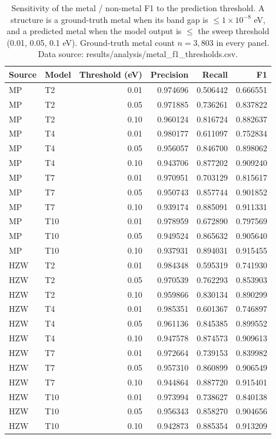 \documentclass[a4paper,10pt]{article}
\begin{document}
\begin{table}[htbp]
\centering
\caption{Sensitivity of the metal / non-metal F1 to the prediction threshold. A structure is a ground-truth metal when its band gap is \(\le 1\times10^{-8}\) eV, and a predicted metal when the model output is \(\le\) the sweep threshold (0.01, 0.05, 0.1 eV). Ground-truth metal count \(n=3{,}803\) in every panel. Data source: \textnormal{results/analysis/metal\_f1\_thresholds.csv}.}
\label{tab:f1-thresholds}
\scriptsize
\begin{tabular}{l l r r r r}
\toprule
Source & Model & Threshold (eV) & Precision & Recall & F1 \\
\midrule
MP & T2  & 0.01 & 0.974696 & 0.506442 & 0.666551 \\
MP & T2  & 0.05 & 0.971885 & 0.736261 & 0.837822 \\
MP & T2  & 0.10 & 0.960124 & 0.816724 & 0.882637 \\
MP & T4  & 0.01 & 0.980177 & 0.611097 & 0.752834 \\
MP & T4  & 0.05 & 0.956057 & 0.846700 & 0.898062 \\
MP & T4  & 0.10 & 0.943706 & 0.877202 & 0.909240 \\
MP & T7  & 0.01 & 0.970951 & 0.703129 & 0.815617 \\
MP & T7  & 0.05 & 0.950743 & 0.857744 & 0.901852 \\
MP & T7  & 0.10 & 0.939174 & 0.885091 & 0.911331 \\
MP & T10 & 0.01 & 0.978959 & 0.672890 & 0.797569 \\
MP & T10 & 0.05 & 0.949524 & 0.865632 & 0.905640 \\
MP & T10 & 0.10 & 0.937931 & 0.894031 & 0.915455 \\
\midrule
HZW & T2  & 0.01 & 0.984348 & 0.595319 & 0.741930 \\
HZW & T2  & 0.05 & 0.970539 & 0.762293 & 0.853903 \\
HZW & T2  & 0.10 & 0.959866 & 0.830134 & 0.890299 \\
HZW & T4  & 0.01 & 0.985351 & 0.601367 & 0.746897 \\
HZW & T4  & 0.05 & 0.961136 & 0.845385 & 0.899552 \\
HZW & T4  & 0.10 & 0.947578 & 0.874573 & 0.909613 \\
HZW & T7  & 0.01 & 0.972664 & 0.739153 & 0.839982 \\
HZW & T7  & 0.05 & 0.957310 & 0.860899 & 0.906549 \\
HZW & T7  & 0.10 & 0.944864 & 0.887720 & 0.915401 \\
HZW & T10 & 0.01 & 0.973994 & 0.738627 & 0.840138 \\
HZW & T10 & 0.05 & 0.956343 & 0.858270 & 0.904656 \\
HZW & T10 & 0.10 & 0.942873 & 0.885354 & 0.913209 \\
\bottomrule
\end{tabular}
\end{table}
\end{document}
